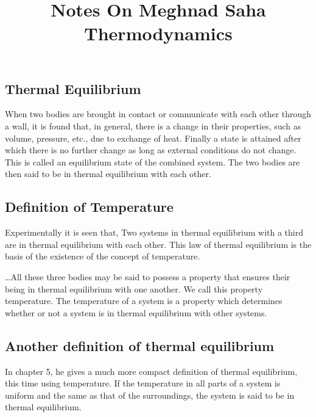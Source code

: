 \documentclass{../template/texnote}
\title{Notes On Meghnad Saha Thermodynamics}
\begin{document}
    \maketitle {}

\section{}
\subsection{Thermal Equilibrium}
When two bodies are brought in contact or communicate with
each other through a wall, it is found that, in general, there is a
change in their properties, such as volume, pressure, etc., due to
exchange of heat. Finally a state is attained after which there is
no further change as long as external conditions do not change.
This is called an equilibrium state of the combined system. The
two bodies are then said to be in thermal equilibrium with each other.

\subsection{Definition of Temperature}
Experimentally it is seen that,
Two systems in thermal equilibrium with a third are in thermal
equilibrium with each other.
This law of thermal equilibrium is the basis of the existence of
the concept of temperature.

\ldots All these three bodies may be said to possess a
property that ensures their being in thermal equilibrium with one
another. We call this property temperature. The temperature of a
system is a property which determines whether or not a system is
in thermal equilibrium with other systems.


\subsection{Another definition of thermal equilibrium}
In chapter 5, he gives a much more compact definition of thermal equilibrium, this time using temperature.
If the temperature in all parts of a system is uniform and the
same as that of the surroundings, the system is said to be in thermal
equilibrium.

    \printbibliography
\end{document}
